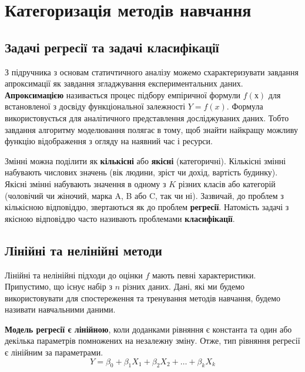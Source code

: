 \documentclass[14pt,a4paper]{extarticle}
\newcounter{e}
\numberwithin{equation}{section}
\numberwithin{figure}{section}
\begin{document}
    \newpage
    \thispagestyle{empty}
    \section{Категоризація методів навчання}
    
    \subsection{Задачі регресії та задачі класифікації}

    З підручника з основам статичтичного аналізу \cite{data2011} можемо схарактеризувати завдання апроксимації як завдання згладжування експериментальних даних. \textbf{Апроксимацією} називається процес підбору емпіричної формули $f(х)$ для встановленої з досвіду функціональної залежності
    $Y = f(x)$. Формула використовується для аналітичного представлення досліджуваних даних. Тобто завдання алгоритму моделювання полягає в тому, щоб знайти найкращу можливу функцію відображення з огляду на наявний час і ресурси. 

    Змінні можна поділити як \textbf{кількісні} або \textbf{якісні} (категоричні). Кількісні змінні набувають числових значень (вік людини, зріст чи дохід, вартість будинку). Якісні змінні набувають значення в одному з $K$ різних класів або категорій (чоловічий чи жіночий, марка A, B або C, так чи ні). 
    Зазвичай, до проблем з кількісною відповіддю, звертаються як до проблем \textbf{регресії}. Натомість задачі з якісною відповіддю часто називають проблемами \textbf{класифікації}. \newline
    
    \subsection{Лінійні та нелінійні методи}

    Лінійні та нелінійні підходи до оцінки $f$ мають певні характеристики. Припустимо, що існує набір з $n$ різних даних. Дані, які ми будемо використовувати для спостереження та тренування методів навчання, будемо називати навчальними даними. \newline
    
    \textbf{Модель регресії є лінійною}, коли доданками рівняння є константа та один або декілька параметрів помножених на незалежну зміну. Отже, тип рівняння регресії є лінійним за параметрами.
    $$
     Y = \beta_{0} + \beta_{1}X_{1} + \beta_{2}X_{2} + \dots + \beta_{k}X_{k} 
    $$
    
\end{document}
